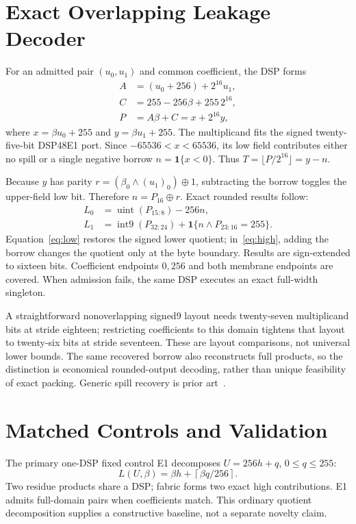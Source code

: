 \documentclass[conference]{IEEEtran}
\begin{document}
\section{Exact Overlapping Leakage Decoder}
For an admitted pair $(u_0,u_1)$ and common coefficient, the DSP forms
\begin{align}
 A&=(u_0+256)+2^{16}u_1,\\
 C&=255-256\beta+255\,2^{16},\\
 P&=A\beta+C=x+2^{16}y,\label{eq:packed}
\end{align}
where $x=\beta u_0+255$ and $y=\beta u_1+255$. The multiplicand fits the signed twenty-five-bit DSP48E1 port. Since $-65536<x<65536$, its low field contributes either no spill or a single negative borrow $n=\mathbf1\{x<0\}$. Thus $T=\lfloor P/2^{16}\rfloor=y-n$.

Because $y$ has parity $r=(\beta_0\land(u_1)_0)\oplus1$, subtracting the borrow toggles the upper-field low bit. Therefore $n=P_{16}\oplus r$. Exact rounded results follow:
\begin{align}
 L_0&=\operatorname{uint}(P_{15:8})-256n,\label{eq:low}\\
 L_1&=\operatorname{int9}(P_{32:24})+
       \mathbf1\{n\land P_{23:16}=255\}.\label{eq:high}
\end{align}
Equation~\eqref{eq:low} restores the signed lower quotient; in~\eqref{eq:high}, adding the borrow changes the quotient only at the byte boundary. Results are sign-extended to sixteen bits. Coefficient endpoints $0,256$ and both membrane endpoints are covered. When admission fails, the same DSP executes an exact full-width singleton.

A straightforward nonoverlapping signed9 layout needs twenty-seven multiplicand bits at stride eighteen; restricting coefficients to this domain tightens that layout to twenty-six bits at stride seventeen. These are layout comparisons, not universal lower bounds. The same recovered borrow also reconstructs full products, so the distinction is economical rounded-output decoding, rather than unique feasibility of exact packing. Generic spill recovery is prior art~\cite{wide}.

\section{Matched Controls and Validation}
The primary one-DSP fixed control E1 decomposes $U=256h+q$, $0\le q\le255$:
\begin{equation}
 L(U,\beta)=\beta h+\left\lceil\beta q/256\right\rceil.
\end{equation}
Two residue products share a DSP; fabric forms two exact high contributions. E1 admits full-domain pairs when coefficients match. This ordinary quotient decomposition supplies a constructive baseline, not a separate novelty claim.
\end{document}
